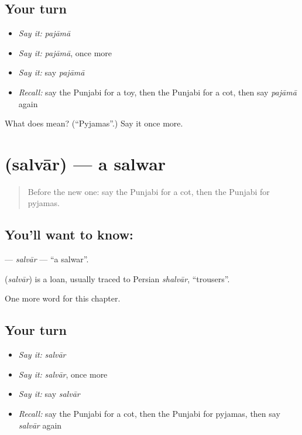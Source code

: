 \subsection*{Your turn}
\begin{itemize}
\raggedright
  \item \emph{Say it:} \emph{pajāmā}
  \item \emph{Say it:} \emph{pajāmā}, once more
  \item \emph{Say it:} say \emph{pajāmā}
  \item \emph{Recall:} say the Punjabi for a toy, then the Punjabi for a cot, then say \emph{pajāmā} again
\end{itemize}

\begin{tcolorbox}[breakable,colback=teal!4,colframe=teal!35!black,title={Before you move on}]
What does  mean? (\textquotedblleft{}Pyjamas\textquotedblright{}.) Say it once more.
\end{tcolorbox}
\section[\texorpdfstring{\pa{ਸਲਵਾਰ} (salvār)}{ਸਲਵਾਰ (salvār)}]{ (salvār) — a salwar}

\label{lesson:PA-C119-salvar}



\begin{quote}
Before the new one: say the Punjabi for a cot, then the Punjabi for pyjamas.
\end{quote}

\subsection*{You'll want to know: }
\textbf{} — \emph{salvār} — \textquotedblleft{}a salwar\textquotedblright{}.

\begin{cousinweb}
\textbf{} (\emph{salvār}) is a loan, usually traced to Persian \emph{shalvār}, \textquotedblleft{}trousers\textquotedblright{}.
\end{cousinweb}

\begin{grammarlens}[title={What you've built}]
One more word for this chapter.
\end{grammarlens}

\subsection*{Your turn}
\begin{itemize}
\raggedright
  \item \emph{Say it:} \emph{salvār}
  \item \emph{Say it:} \emph{salvār}, once more
  \item \emph{Say it:} say \emph{salvār}
  \item \emph{Recall:} say the Punjabi for a cot, then the Punjabi for pyjamas, then say \emph{salvār} again
\end{itemize}

